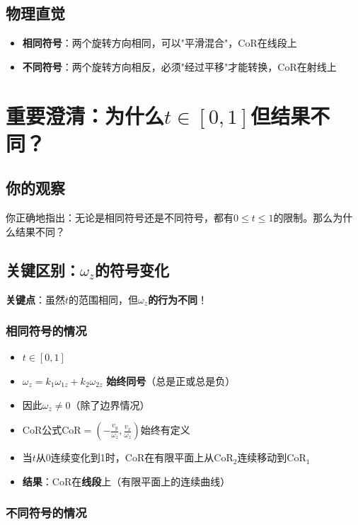 \documentclass[12pt,a4paper]{article}
\begin{document}
\subsection{物理直觉}

\begin{itemize}
\item \textbf{相同符号}：两个旋转方向相同，可以"平滑混合"，CoR在线段上
\item \textbf{不同符号}：两个旋转方向相反，必须"经过平移"才能转换，CoR在射线上
\end{itemize}

\section{重要澄清：为什么$t \in [0,1]$但结果不同？}

\subsection{你的观察}

你正确地指出：无论是相同符号还是不同符号，都有$0 \leq t \leq 1$的限制。那么为什么结果不同？

\subsection{关键区别：$\omega_z$的符号变化}

\textbf{关键点}：虽然$t$的范围相同，但\textbf{$\omega_z$的行为不同}！

\subsubsection{相同符号的情况}

\begin{itemize}
\item $t \in [0, 1]$
\item $\omega_z = k_1 \omega_{1z} + k_2 \omega_{2z}$ \textbf{始终同号}（总是正或总是负）
\item 因此$\omega_z \neq 0$（除了边界情况）
\item CoR公式$\text{CoR} = \left(-\frac{v_y}{\omega_z}, \frac{v_x}{\omega_z}\right)$始终有定义
\item 当$t$从0连续变化到1时，CoR在有限平面上从CoR$_2$连续移动到CoR$_1$
\item \textbf{结果}：CoR在\textbf{线段}上（有限平面上的连续曲线）
\end{itemize}

\subsubsection{不同符号的情况}
\end{document}
